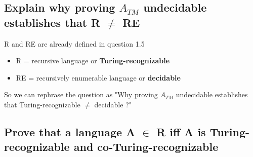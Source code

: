 \documentclass[main.tex]{subfiles}
\begin{document}


\subsection{Explain why proving $A_{TM}$ undecidable establishes that R $\neq$ RE}
R and RE are already defined in question 1.5
\begin{itemize}
    \item R =  recursive language or \textbf{Turing-recognizable}
    \item RE =  recursively enumerable language or \textbf{decidable}
\end{itemize}
So we can rephrase the question as "Why proving $A_{TM}$ undecidable establishes that Turing-recognizable $\neq$ decidable ?"
\subsection{Prove that a language A $\in$ R iff A is Turing-recognizable and co-Turing-recognizable}
\end{document}
